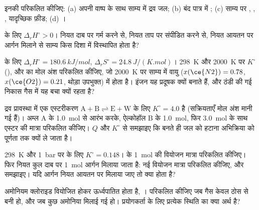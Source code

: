 \begin{exercise}[$\star$]\label{exo:b2:equilibrium-shifts:3}
इनकी  परिकलित कीजिए: (a) अपनी वाष्प के साथ साम्य में द्रव जल;
(b) बंद पात्र में ; (c) साम्य पर ,
, , यादृच्छिक फ़ीड; (d) ।
\end{exercise}

\begin{exercise}[$\star$]\label{exo:b2:equilibrium-shifts:4}
 के लिए $\Delta_r H^\circ > 0$। नियत दाब पर गर्म करने से,
नियत ताप पर संपीडित करने से, नियत आयतन पर आर्गन मिलाने से साम्य किस दिशा में
विस्थापित होता है?
\end{exercise}

\begin{exercise}[$\star\star$]\label{exo:b2:equilibrium-shifts:5}
 के लिए $\Delta_r H^\circ = \qty{180.6}{kJ/mol}$,
$\Delta_r S^\circ = \qty{24.8}{J/(K.mol)}$। \qty{298}{K}
और \qty{2000}{K} पर $K^\circ$ (), और  का मोल अंश परिकलित
कीजिए, जो \qty{2000}{K} पर साम्य में वायु ($x(\ce{N2}) = 0.78$, $x(\ce{O2}) = 0.21$,
थोड़ा उपभुक्त) में होता है। इंजन यह प्रदूषक क्यों बनाते हैं, और ठंडी की गई
निकास गैस में यह बचा क्यों रहता है?
\end{exercise}

\begin{exercise}[$\star\star$]\label{exo:b2:equilibrium-shifts:6}
द्रव प्रावस्था में एक एस्टरीकरण $\mathrm{A + B \rightleftharpoons E + W}$ के लिए
$K^\circ = 4.0$ है (सक्रियताएँ मोल अंश मानी गई हैं)। अम्ल A के
\qty{1.0}{mol} से आरंभ करके, ऐल्कोहॉल B के \qty{1.0}{mol}, फिर
\qty{3.0}{mol} के साथ एस्टर की मात्रा परिकलित कीजिए। $Q$ और $K^\circ$ से समझाइए कि बनते ही
जल को हटाना अभिक्रिया को पूर्णता तक क्यों ले जाता है।
\end{exercise}

\begin{exercise}[$\star\star$]\label{exo:b2:equilibrium-shifts:7}
\qty{298}{K} और \qty{1}{bar} पर  के लिए $K^\circ = 0.148$।
 के \qty{1}{mol} की वियोजन मात्रा परिकलित कीजिए। फिर
नियत कुल दाब पर \qty{1}{mol} आर्गन मिलाया जाता है: नई
वियोजन मात्रा परिकलित कीजिए, और समझाइए। यदि आर्गन नियत आयतन पर मिलाया जाए
तो क्या होता है?
\end{exercise}

\begin{exercise}[$\star\star$]\label{exo:b2:equilibrium-shifts:8}
अमोनियम क्लोराइड वियोजित होकर ऊर्ध्वपातित होता है, ।  परिकलित कीजिए जब गैस केवल ठोस से बनी हो, और जब
कुछ अमोनिया मिलाई गई हो। प्रयोगकर्ता के लिए प्रत्येक स्थिति का क्या अर्थ है?
\end{exercise}

